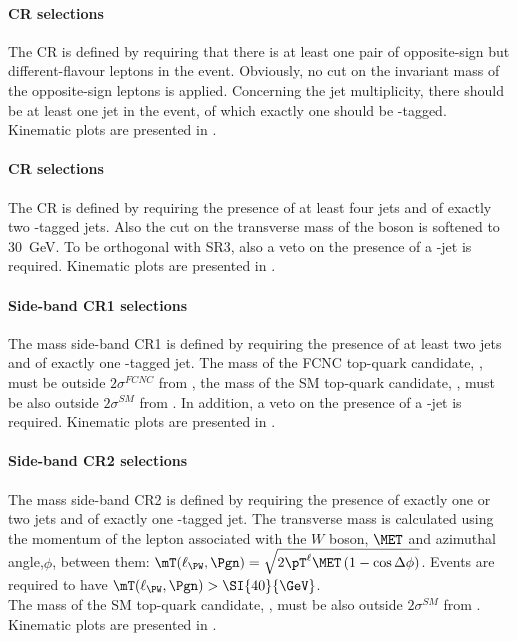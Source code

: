\paragraph{\ttbar CR selections}
The \ttbar CR is defined by requiring that there is at least one pair
of opposite-sign but different-flavour leptons in the
event. Obviously, no cut on the invariant mass of the opposite-sign
leptons is applied. Concerning the jet multiplicity, there should be
at least one jet in the event, of which exactly one should be
\Pqb-tagged. Kinematic plots are presented in .

\paragraph{\ttZ CR selections}
\label{sec:bkg:ttz}
The \ttZ CR is defined by requiring the presence of at least four jets
and of exactly two \Pqb-tagged jets. Also the cut on the transverse
mass of the \PW boson is softened to \SI{30}{\GeV}. To be orthogonal 
with SR3, also a veto on the presence of a \Pqc-jet is required. 
Kinematic plots are presented in .

\paragraph{Side-band CR1 selections}
\label{sec:bkg:sbcr1tzu}
The mass side-band CR1 is defined by requiring the presence of at least two jets
and of exactly one \Pqb-tagged jet.
The mass of the FCNC top-quark candidate, \mtopfcnc,
must be outside $2\sigma^{FCNC}$ from \mtopvalue, the mass of the
SM top-quark candidate, \mtopsm, must be also outside $2\sigma^{SM}$
from \mtopvalue.  In addition, a veto on the presence of a \Pqc-jet is required. 
Kinematic plots are presented in .

\paragraph{Side-band CR2 selections}
\label{sec:bkg:sbcr2}
The mass side-band CR2 is defined by requiring the presence of exactly one or two jets
and of exactly one \Pqb-tagged jet.   The transverse mass is calculated using the momentum of the lepton associated with the $W$ boson, $\MET$ and azimuthal angle,$\phi$, between them: 
$\mT(\ell_{\PW},\Pgn) = \sqrt{2\pT^{\ell}\MET \left(1-\cos\Delta\phi\right)}$.
Events are required to have $\mT(\ell_{\PW},\Pgn) > \SI{40}{\GeV}$.\\
The mass of the SM top-quark candidate, \mtopsm, must be also outside $2\sigma^{SM}$
from \mtopvalue. Kinematic plots are presented in .

